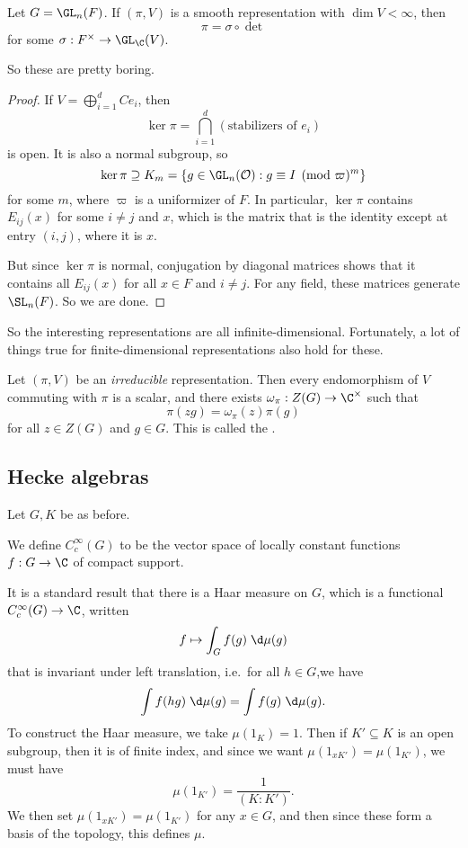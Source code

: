 \documentclass[a4paper]{article}
\begin{document}
\begin{prop}
  Let $G = \GL_n(F)$. If $(\pi, V)$ is a smooth representation with $\dim V < \infty$, then
  \[
    \pi = \sigma \circ \det
  \]
  for some $\sigma: F^\times \to \GL_\C(V)$.
\end{prop}
So these are pretty boring.

\begin{proof}
  If $V = \bigoplus_{i = 1}^d C e_i$, then
  \[
    \ker \pi = \bigcap_{i = 1}^d (\text{stabilizers of }e_i)
  \]
  is open. It is also a normal subgroup, so
  \[
    \ker \pi \supseteq K_m = \{g \in \GL_n(\mathcal{O}) : g \equiv I \pmod \varpi^m\}
  \]
  for some $m$, where $\varpi$ is a uniformizer of $F$. In particular, $\ker \pi$ contains $E_{ij}(x)$ for some $i \not= j$ and $x$, which is the matrix that is the identity except at entry $(i, j)$, where it is $x$.

  But since $\ker \pi$ is normal, conjugation by diagonal matrices shows that it contains all $E_{ij}(x)$ for all $x \in F$ and $i \not= j$. For any field, these matrices generate $\SL_n(F)$. So we are done.
\end{proof}
So the interesting representations are all infinite-dimensional. Fortunately, a lot of things true for finite-dimensional representations also hold for these.

\begin{lemma}
  Let $(\pi, V)$ be an \emph{irreducible} representation. Then every endomorphism of $V$ commuting with $\pi$ is a scalar, and there exists $\omega_\pi: Z(G) \to \C^\times$ such that
  \[
    \pi(zg) = \omega_\pi(z)  \pi(g)
  \]
  for all $z \in Z(G)$ and $g \in G$. This is called the .  \end{lemma}
\subsection{Hecke algebras}
Let $G, K$ be as before.
\begin{defi}[$C_c^\infty(G)$]
  We define $C_c^\infty(G)$ to be the vector space of locally constant functions $f: G \to \C$ of compact support.
\end{defi}
It is a standard result that there is a Haar measure on $G$, which is a functional $C_c^\infty(G) \to \C$, written
\[
  f \mapsto \int_G f(g) \;\d \mu (g)
\]
that is invariant under left translation, i.e.\ for all $h \in G$,we have
\[
  \int f(hg) \;\d \mu(g) = \int f(g)\;\d \mu(g).
\]
To construct the Haar measure, we take $\mu(1_K) = 1$. Then if $K' \subseteq K$ is an open subgroup, then it is of finite index, and since we want $\mu(1_{xK'}) = \mu(1_{K'})$, we must have
\[
  \mu(1_{K'}) = \frac{1}{(K:K')}.
\]
We then set $\mu(1_{xK'}) = \mu(1_{K'})$ for any $x \in G$, and then since these form a basis of the topology, this defines $\mu$.
\end{document}
